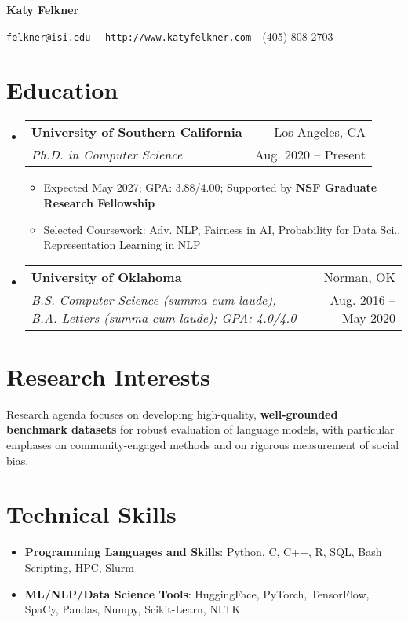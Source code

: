 \documentclass[letterpaper,11pt]{article}
\makeatletter
\newcommand{\resumeItemWithHeader}[2]{
  \item\small{
    \textbf{#1}{: #2 \vspace{-2pt}}
  }
}
\newcommand{\resumeItem}[1]{
  \item\small{
  {#1 \vspace{-2pt}}
  }
}
\newcommand{\resumeSubheading}[4]{
  \vspace{-1pt} \item
    \begin{tabular*}{0.97\textwidth}{l@{\extracolsep{\fill}}r}
      \textbf{#1} & #2 \\
      \textit{\small#3} & \small #4 \\
      
    \end{tabular*}\vspace{-5pt}
}
\newcommand{\resumeSubHeadingListStart}{\begin{itemize}[label={}, leftmargin=*]}
\newcommand{\resumeSubHeadingListEnd}{\end{itemize}}
\newcommand{\resumeItemListStart}{\begin{itemize}}
\newcommand{\resumeItemListEnd}{\end{itemize}\vspace{-5pt}}
\makeatother
\begin{document}
\textbf{\LARGE Katy Felkner}

\href{mailto:felkner@isi.edu}{\texttt{felkner@isi.edu}}~\textbar~ \href{http://katyfelkner.com/}{\texttt{http://www.katyfelkner.com}}~\textbar~(405) 808-2703


\section{Education}
  \resumeSubHeadingListStart
    \resumeSubheading
      {University of Southern California}{Los Angeles, CA}
      {Ph.D. in Computer Science}{Aug. 2020 -- Present}
      \resumeItemListStart
        \resumeItem{Expected May 2027; GPA: 3.88/4.00; Supported by \textbf{NSF Graduate Research Fellowship}}
      \resumeItem{Selected Coursework: Adv. NLP, Fairness in AI, Probability for Data Sci., Representation Learning in NLP}
      \resumeItemListEnd
      
    \resumeSubheading
      {University of Oklahoma}{Norman, OK}
      {B.S. Computer Science \textit{(summa cum laude)}, B.A. Letters \textit{(summa cum laude)}; GPA: 4.0/4.0}{Aug. 2016 -- May 2020}
  \resumeSubHeadingListEnd

\section{Research Interests}
\small{Research agenda focuses on developing high-quality, \textbf{well-grounded benchmark datasets} for robust evaluation of language models, with particular emphases on community-engaged methods and on rigorous measurement of social bias.}

\section{Technical Skills}
 \resumeSubHeadingListStart
   \resumeItemWithHeader{Programming Languages and Skills}{Python, C, C++, R, SQL, Bash Scripting, HPC, Slurm}
   \resumeItemWithHeader{ML/NLP/Data Science Tools}{HuggingFace, PyTorch, TensorFlow, SpaCy, Pandas, Numpy, Scikit-Learn, NLTK}
 \resumeSubHeadingListEnd
\end{document}
